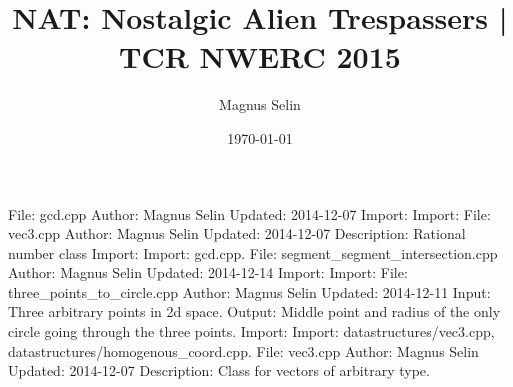 \documentclass[a4paper]{article}
\title{NAT: Nostalgic Alien Trespassers | TCR NWERC 2015}
\date{\today}
\author{Magnus Selin}
\begin{document}
\maketitle
\begin{multicols}{2}
\tableofcontents
\end{multicols}
\newpage
\scriptsize

\begin{multicols}{2}

File: gcd.cpp\newline 
Author: Magnus Selin\newline 
Updated: 2014-12-07\newline 
Import: \newline 
Import: \newline 
File: vec3.cpp\newline 
Author: Magnus Selin\newline 
Updated: 2014-12-07\newline 
Description: Rational number class\newline 
Import: \newline 
Import: gcd.cpp.\newline 
File: segment\_segment\_intersection.cpp\newline 
Author: Magnus Selin\newline 
Updated: 2014-12-14\newline 
Import: \newline 
Import: \newline 
File: three\_points\_to\_circle.cpp\newline 
Author: Magnus Selin\newline 
Updated: 2014-12-11\newline 
Input: Three arbitrary points in 2d space.\newline 
Output: Middle point and radius of the only circle going through the three points.\newline 
Import: \newline 
Import: datastructures/vec3.cpp, datastructures/homogenous\_coord.cpp.\newline 
File: vec3.cpp\newline 
Author: Magnus Selin\newline 
Updated: 2014-12-07\newline 
Description: Class for vectors of arbitrary type.\newline 

\end{multicols}
\end{document}
